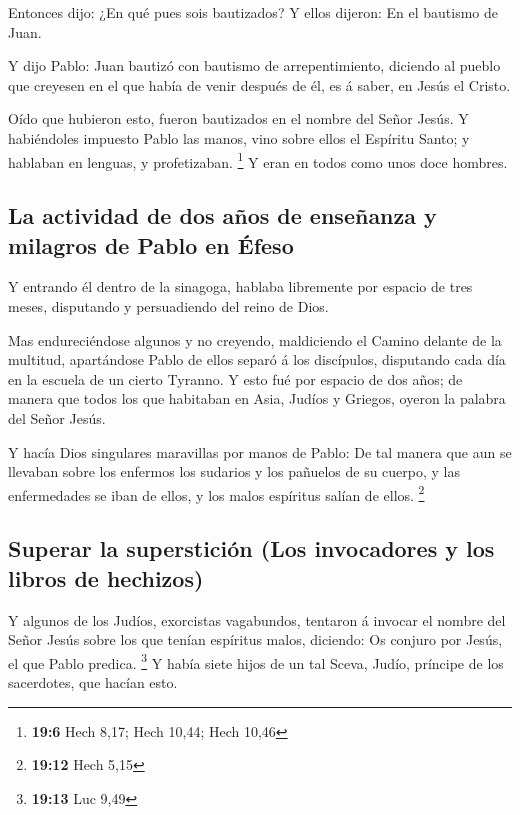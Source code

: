  Entonces dijo: ¿En qué pues sois bautizados? Y ellos
dijeron: En el bautismo de Juan.

 Y dijo Pablo: Juan bautizó con bautismo de
arrepentimiento, diciendo al pueblo que creyesen en el que había de
venir después de él, es á saber, en Jesús el Cristo.

 Oído que hubieron esto, fueron bautizados en el nombre
del Señor Jesús.  Y habiéndoles impuesto Pablo las manos,
vino sobre ellos el Espíritu Santo; y hablaban en lenguas, y
profetizaban. \footnote{\textbf{19:6} Hech 8,17; Hech 10,44; Hech 10,46}
 Y eran en todos como unos doce hombres.

\hypertarget{la-actividad-de-dos-auxf1os-de-enseuxf1anza-y-milagros-de-pablo-en-uxe9feso}{%
\subsection{La actividad de dos años de enseñanza y milagros de Pablo en
Éfeso}\label{la-actividad-de-dos-auxf1os-de-enseuxf1anza-y-milagros-de-pablo-en-uxe9feso}}

 Y entrando él dentro de la sinagoga, hablaba libremente
por espacio de tres meses, disputando y persuadiendo del reino de Dios.

 Mas endureciéndose algunos y no creyendo, maldiciendo el
Camino delante de la multitud, apartándose Pablo de ellos separó á los
discípulos, disputando cada día en la escuela de un cierto Tyranno.
 Y esto fué por espacio de dos años; de manera que todos
los que habitaban en Asia, Judíos y Griegos, oyeron la palabra del Señor
Jesús.

 Y hacía Dios singulares maravillas por manos de Pablo:
 De tal manera que aun se llevaban sobre los enfermos los
sudarios y los pañuelos de su cuerpo, y las enfermedades se iban de
ellos, y los malos espíritus salían de ellos. \footnote{\textbf{19:12}
  Hech 5,15}

\hypertarget{superar-la-supersticiuxf3n-los-invocadores-y-los-libros-de-hechizos}{%
\subsection{Superar la superstición (Los invocadores y los libros de
hechizos)}\label{superar-la-supersticiuxf3n-los-invocadores-y-los-libros-de-hechizos}}

 Y algunos de los Judíos, exorcistas vagabundos, tentaron
á invocar el nombre del Señor Jesús sobre los que tenían espíritus
malos, diciendo: Os conjuro por Jesús, el que Pablo predica. \footnote{\textbf{19:13}
  Luc 9,49}  Y había siete hijos de un tal Sceva, Judío,
príncipe de los sacerdotes, que hacían esto.

